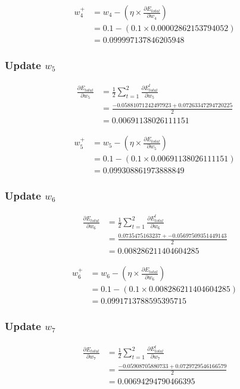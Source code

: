 \documentclass{article}
\begin{document}
\begin{align*}
    w_{4}^{+} &= w_4 - (\eta \times \frac{\partial E_{total}}{\partial w_4}) \\
    & = 0.1 - (0.1 \times 0.00002862153794052) \\
    & = 0.099997137846205948
\end{align*}
\subsubsection{Update $w_5$}
\begin{align*}
    \frac{\partial E_{total}}{\partial w_5} & =
        \frac{1}{2}
            \sum_{t=1}^{2}{
                \frac{\partial E_{total}^{t}}{\partial w_5}} \\
    & = \frac{-0.05881071242497923 + 0.07263347294720225}{2} \\
    & = 0.00691138026111151
\end{align*}

\begin{align*}
    w_{5}^{+} &= w_5 - (\eta \times \frac{\partial E_{total}}{\partial w_5}) \\
    & = 0.1 - (0.1 \times 0.00691138026111151) \\
    & = 0.099308861973888849
\end{align*}
\subsubsection{Update $w_6$}
\begin{align*}
    \frac{\partial E_{total}}{\partial w_6} & =
        \frac{1}{2}
            \sum_{t=1}^{2}{
                \frac{\partial E_{total}^{t}}{\partial w_6}} \\
    & = \frac{0.0735475163237 + -0.05697509351449143}{2} \\
    & = 0.008286211404604285
\end{align*}

\begin{align*}
    w_{6}^{+} &= w_6 - (\eta \times \frac{\partial E_{total}}{\partial w_6}) \\
    & = 0.1 - (0.1 \times 0.008286211404604285) \\
    & = 0.0991713788595395715
\end{align*}
\subsubsection{Update $w_7$}
\begin{align*}
    \frac{\partial E_{total}}{\partial w_7} & =
        \frac{1}{2}
            \sum_{t=1}^{2}{
                \frac{\partial E_{total}^{t}}{\partial w_7}} \\
    & = \frac{-0.05908705880733 + 0.0729729546166579}{2} \\
    & = 0.00694294790466395
\end{align*}
\end{document}
